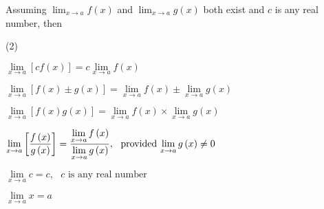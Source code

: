 \documentclass[11pt,a4paper]{book}
\begin{document}
\begin{tcolorbox}[colback=blue!5, colframe=black, boxrule=.4pt, sharpish corners]


Assuming ${\displaystyle \lim_{x\rightarrow a}f\left(x\right)}$ and
${\displaystyle \lim_{x\rightarrow a}g\left(x\right)}$ both exist
and $c$ is any real number, then

\begin{tasks}[style=itemize,label-width=3.5ex](2)

\task  $\mathop{\lim}\limits _{x\to a}\left[{cf\left(x\right)}\right]=c\mathop{\lim}\limits _{x\to a}f\left(x\right)$

\task  $\mathop{\lim}\limits _{x\to a}\left[{f\left(x\right)\pm g\left(x\right)}\right]=\mathop{\lim}\limits _{x\to a}f\left(x\right)\pm\mathop{\lim}\limits _{x\to a}g\left(x\right)$

\task  $\mathop{\lim}\limits _{x\to a}\left[{f\left(x\right)g\left(x\right)}\right]=\mathop{\lim}\limits _{x\to a}f\left(x\right)\times\mathop{\lim}\limits _{x\to a}g\left(x\right)$

\task ${\displaystyle \mathop{\lim}\limits _{x\to a}\left[{\frac{{f\left(x\right)}}{{g\left(x\right)}}}\right]=\frac{{\mathop{\lim}\limits _{x\to a}f\left(x\right)}}{{\mathop{\lim}\limits _{x\to a}g\left(x\right)}}{\rm {,}}\,\,\,\,\,{\rm {provided}}\,\mathop{\lim}\limits _{x\to a}g\left(x\right)\ne0}$

\task  $\mathop{\lim}\limits _{x\to a}c=c,\,\,\,\,c{\mbox{ is any real number}}$

\task  $\mathop{\lim}\limits _{x\to a}x=a$

\end{tasks}

\end{tcolorbox}
\end{document}
